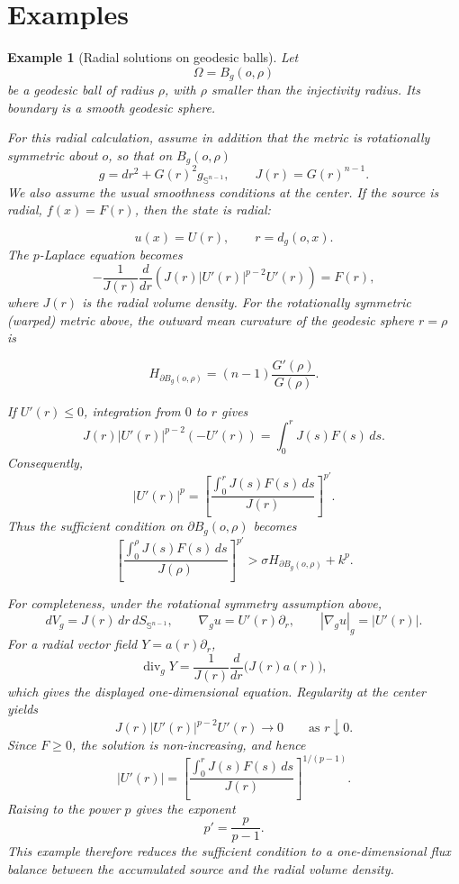 \documentclass{article}
\newtheorem{example}[theorem]{Example}
\begin{document}
\section{Examples}
\begin{example}[Radial solutions on geodesic balls]
Let
\[
\Omega=B_g(o,\rho)
\]
be a geodesic ball of radius $\rho$, with $\rho$ smaller than the injectivity
radius. Its boundary is a smooth geodesic sphere.

For this radial calculation, assume in addition that the metric is rotationally
symmetric about $o$, so that on $B_g(o,\rho)$
\[
g=dr^2+G(r)^2g_{\mathbb S^{n-1}},
\qquad J(r)=G(r)^{n-1}.
\]
We also assume the usual smoothness conditions at the center. If the source is
radial, $f(x)=F(r)$, then the state is radial:

\[
u(x)=U(r),
\qquad
r=d_g(o,x).
\]
The $p$-Laplace equation becomes
\[
-\frac1{J(r)}
\frac d{dr}
\left(
J(r)|U'(r)|^{p-2}U'(r)
\right)
=
F(r),
\]
where $J(r)$ is the radial volume density. For the rotationally symmetric (warped) metric above, the outward mean curvature of the geodesic sphere $r=\rho$ is


\[
H_{\partial B_g(o,\rho)}=(n-1)\frac{G'(\rho)}{G(\rho)}.
\]

If $U'(r)\leq0$, integration
from $0$ to $r$ gives
\[
J(r)|U'(r)|^{p-2}(-U'(r))
=
\int_0^rJ(s)F(s)\,ds.
\]
Consequently,
\[
|U'(r)|^p
=
\left[
\frac{\displaystyle\int_0^rJ(s)F(s)\,ds}
{J(r)}
\right]^{p'}.
\]
Thus the sufficient condition on $\partial B_g(o,\rho)$ becomes
\[
\left[
\frac{\displaystyle\int_0^\rho J(s)F(s)\,ds}
{J(\rho)}
\right]^{p'}
>
\sigma H_{\partial B_g(o,\rho)}+k^p.
\]

For completeness, under the rotational symmetry assumption above,
\[
dV_g=J(r)\,dr\,dS_{\mathbb S^{n-1}},
\qquad
\nabla_gu=U'(r)\partial_r,
\qquad
|\nabla_gu|_g=|U'(r)|.
\]
For a radial vector field $Y=a(r)\partial_r$,
\[
\operatorname{div}_gY
=
\frac1{J(r)}\frac{d}{dr}\bigl(J(r)a(r)\bigr),
\]
which gives the displayed one-dimensional equation. Regularity at the
center yields
\[
J(r)|U'(r)|^{p-2}U'(r)\longrightarrow0
\qquad\text{as }r\downarrow0.
\]
Since $F\geq0$, the solution is non-increasing, and hence
\[
|U'(r)|
=
\left[
\frac{\displaystyle\int_0^rJ(s)F(s)\,ds}{J(r)}
\right]^{1/(p-1)}.
\]
Raising to the power $p$ gives the exponent
\[
p'=\frac{p}{p-1}.
\]
This example therefore reduces the sufficient condition to a one-dimensional
flux balance between the accumulated source and the radial volume density.
\end{example}
\end{document}
